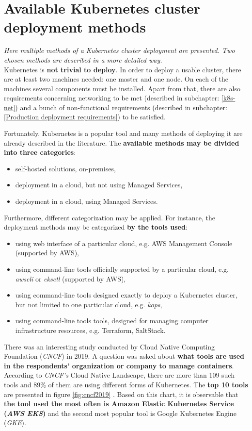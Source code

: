 \section{Available Kubernetes cluster deployment methods}
\label{3-methods}
\textit{Here multiple methods of a Kubernetes cluster deployment are presented. Two chosen methods are described in a more detailed way. }
\\

Kubernetes is \textbf{not trivial to deploy}. In order to deploy a usable cluster, there are at least two machines needed: one master and one node. On each of the machines several components must be installed. Apart from that, there are also requirements concerning networking to be met (described in subchapter: \ref{k8s-net}) and a bunch of non-functional requirements (described in subchapter: \ref{Production deployment requirements}) to be satisfied.

Fortunately, Kubernetes is a popular tool and many methods of deploying it are already described in the literature. The \textbf{available methods may be divided into three categories}:
\begin{itemize}
\item self-hosted solutions, on-premises,
\item deployment in a cloud, but not using Managed Services,
\item deployment in a cloud, using Managed Services.
\end{itemize}

Furthermore, different categorization may be applied. For instance, the deployment methods may be categorized \textbf{by the tools used}:
\begin{itemize}
\item using web interface of a particular cloud, e.g. AWS Management Console (supported by AWS),
\item using command-line tools officially supported by a particular cloud, e.g. \textit{awscli} or \textit{eksctl} (supported by AWS),
\item using command-line tools designed exactly to deploy a Kubernetes cluster, but not limited to one particular cloud, e.g. \textit{kops},
\item using command-line tools tools, designed for managing computer infrastructure resources, e.g. Terraform, SaltStack.
\end{itemize}

There was an interesting study conducted by Cloud Native Computing Foundation (\textit{CNCF}) in 2019. A question was asked about \textbf{what tools are used in the respondents' organization or company to manage containers}. According to \textit{CNCF's} Cloud Native Landscape, there are more than 109 such tools and 89\% of them are using different forms of Kubernetes. The \textbf{top 10 tools} are presented in figure \ref{fig:cncf2019} \cite{cncf-2019}. Based on this chart, it is observable that \textbf{the tool used the most often is Amazon Elastic Kubernetes Service (\textit{AWS EKS})} and the second most popular tool is Google Kubernetes Engine (\textit{GKE}).

